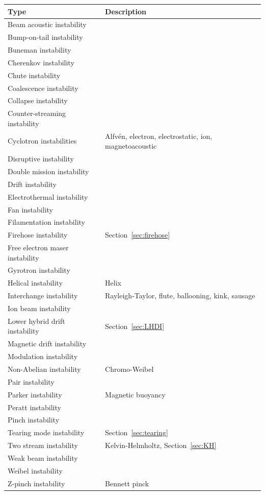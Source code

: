 \documentclass[
  notoc %
]{tufte-book}
\begin{document}
\begin{longtable}[]{@{}
  >{\raggedright\arraybackslash}p{}
  >{\raggedright\arraybackslash}p{}@{}}
\toprule
Type & Description \\
\midrule
\endhead
Beam acoustic instability & \\
Bump-on-tail instability & \\
Buneman instability & \\
Cherenkov instability & \\
Chute instability & \\
Coalescence instability & \\
Collapse instability & \\
Counter-streaming instability & \\
Cyclotron instabilities & Alfvén, electron, electrostatic, ion,
magnetoacoustic \\
Disruptive instability & \\
Double mission instability & \\
Drift instability & \\
Electrothermal instability & \\
Fan instability & \\
Filamentation instability & \\
Firehose instability & Section~\ref{sec:firehose} \\
Free electron maser instability & \\
Gyrotron instability & \\
Helical instability & Helix \\
Interchange instability & Rayleigh-Taylor, flute, ballooning, kink,
sausage \\
Ion beam instability & \\
Lower hybrid drift instability & Section~\ref{sec:LHDI} \\
Magnetic drift instability & \\
Modulation instability & \\
Non-Abelian instability & Chromo-Weibel \\
Pair instability & \\
Parker instability & Magnetic buoyancy \\
Peratt instability & \\
Pinch instability & \\
Tearing mode instability & Section~\ref{sec:tearing} \\
Two stream instability & Kelvin-Helmholtz, Section~\ref{sec:KH} \\
Weak beam instability & \\
Weibel instability & \\
Z-pinch instability & Bennett pinck \\
\bottomrule
\end{longtable}
\end{document}
